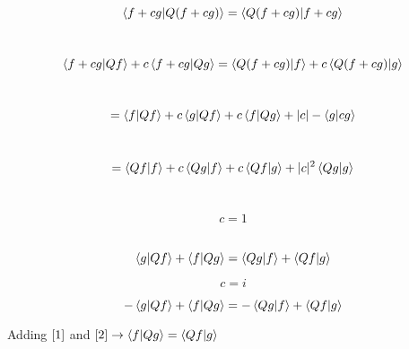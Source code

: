 \documentclass{article}
\begin{document}
$$\ev{f+cg|Q(f+cg)}=\ev{Q(f+cg)|f+cg}$$\

$$\ev{f+cg|Qf}+c\ev{f+cg|Qg}=\ev{Q(f+cg)|f}+c\ev{Q(f+cg)|g}$$\

$$=\ev{f|Qf}+c\ev{g|Qf}+c\ev{f|Qg}+|c|-\ev{g|cg}$$\

$$=\ev{Qf|f}+c\ev{Qg|f}+c\ev{Qf|g}+|c|^{2}\ev{Qg|g}$$\

$$c=1$$\

\begin{equation} \label{1}
\ev{g|Qf}+\ev{f|Qg}=\ev{Qg|f}+\ev{Qf|g}
\end{equation} 

$$c=i$$

\begin{equation} \label{2}
-\ev{g|Qf}+\ev{f|Qg}=-\ev{Qg|f}+\ev{Qf|g}
\end{equation}

\begin{center}
Adding $\ref{1}$ and $\ref{2} \rightarrow \ev{f|Qg}=\ev{Qf|g}$   
\end{center}
\end{document}
